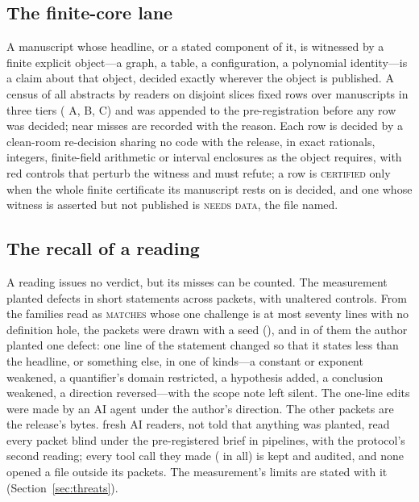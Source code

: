\documentclass[preprint,11pt,authoryear,a4paper]{elsarticle}
\newcommand{\vword}[1]{{\normalfont\scshape #1}}
\newcommand{\vC}{\vword{certified}}
\newcommand{\wMatches}{\vword{matches}}
\begin{document}
\subsection{The finite-core lane}\label{sec:lanef}
A manuscript whose headline, or a stated component of it, is witnessed by a finite explicit object---a graph, a table, a configuration, a polynomial identity---is a claim about that object, decided exactly wherever the object is published. A census of all \OmDenManuscripts{} abstracts by \OmFReaders{} readers on disjoint slices fixed \OmFRows{} rows over \OmFManuscripts{} manuscripts in three tiers (\OmFTierA{} A, \OmFTierB{} B, \OmFTierC{} C) and was appended to the pre-registration before any row was decided; \OmFNearMisses{} near misses are recorded with the reason. Each row is decided by a clean-room re-decision sharing no code with the release, in exact rationals, integers, finite-field arithmetic or interval enclosures as the object requires, with red controls that perturb the witness and must refute; a row is \vC{} only when the whole finite certificate its manuscript rests on is decided, and one whose witness is asserted but not published is \vword{needs data}, the file named.

\subsection{The recall of a reading}\label{sec:recall}
A reading issues no verdict, but its misses can be counted. The measurement planted \MtRrPlants{} defects in short statements across \MtRrPackets{} packets, with \MtRrControls{} unaltered controls. From the \MtRrEligible{} families read as \wMatches{} whose one challenge is at most seventy lines with no definition hole, the \MtRrPackets{} packets were drawn with a seed (\OmRecallSeed), and in \MtRrPlants{} of them the author planted one defect: one line of the statement changed so that it states less than the headline, or something else, in one of \OmRecallKinds{} kinds---a constant or exponent weakened, a quantifier's domain restricted, a hypothesis added, a conclusion weakened, a direction reversed---with the scope note left silent. The one-line edits were made by an AI agent under the author's direction. The other \MtRrControls{} packets are the release's bytes. \OmRecallReaders{} fresh AI readers, not told that anything was planted, read every packet blind under the pre-registered brief in \MtRrPipelines{} pipelines, with the protocol's second reading; every tool call they made (\OmRecallCalls{} in all) is kept and audited, and none opened a file outside its packets. The measurement's \OmRecallLimits{} limits are stated with it (Section~\ref{sec:threats}).
\end{document}
